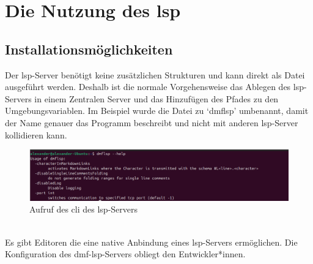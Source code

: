 \documentclass[./einleitung.tex]{subfiles}
\begin{document}
    \section{Die Nutzung des \acrshort{lsp}}
    \subsection{Installationsmöglichkeiten}
    Der \acrshort{lsp}-Server benötigt keine zusätzlichen Strukturen und kann direkt als Datei ausgeführt werden.
    Deshalb ist die normale Vorgehensweise das Ablegen des \acrshort{lsp}-Servers in einem Zentralen Server und das Hinzufügen des Pfades zu den Umgebungsvariablen.
    Im Beispiel wurde die Datei zu `dmflsp' umbenannt, damit der Name genauer das Programm beschreibt und nicht mit anderen \acrshort{lsp}-Server kollidieren kann.\\
    \begin{figure}[H]
        \centering
        \includegraphics[width=\linewidth]{bilder/screenshot-lsp-help}
        \caption{Aufruf des \acrshort{cli} des \acrshort{lsp}-Servers}
        \label{fig:screenshot-lsp-help}
    \end{figure}\\
    Es gibt Editoren die eine native Anbindung eines \acrshort{lsp}-Servers ermöglichen.
    Die Konfiguration des \acrshort{dmf}-\acrshort{lsp}-Servers obliegt den Entwickler*innen.
\end{document}
